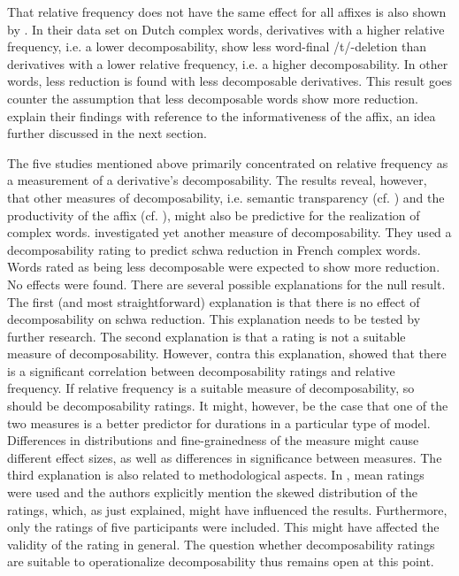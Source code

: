 {That relative frequency does not have the same effect for all affixes is also shown by \cite{Schuppler.2012}. In their data set on Dutch complex words, derivatives with a higher relative frequency, i.e. a lower decomposability, show less word-final /t/-deletion than derivatives with a lower relative frequency, i.e. a higher decomposability. In other words, less reduction is found with less decomposable derivatives. This result goes counter the assumption that less decomposable words show more reduction. \cite{Schuppler.2012} explain their findings with reference to the informativeness of the affix, an idea further discussed in the next section.

The five studies mentioned above primarily concentrated on relative frequency as a measurement of a derivative's decomposability. The results reveal, however, that other measures of decomposability, i.e. semantic transparency (cf. \citealt{Hanique.2011}) and the productivity of the affix (cf. \citealt{Hay.2007}), might also be predictive for the realization of complex words.  
\cite{Burki.2011} investigated yet another measure of decomposability. They used a decomposability rating to predict schwa reduction in French complex words. Words rated as being less decomposable were expected to show more reduction. No effects were found. There are several possible explanations for the null result. 
The first (and most straightforward) explanation is that there is no effect of decomposability on schwa reduction. This explanation needs to be tested by further research. 
The second explanation is that a rating is not a suitable measure of decomposability. However, contra this explanation, \cite{Hay.2001,Hay.2003} showed that there is a significant correlation between decomposability ratings and relative frequency. If relative frequency is a suitable measure of decomposability, so should be decomposability ratings. It might, however, be the case that one of the two measures is a better predictor for durations in a particular type of model.  Differences in distributions and fine-grainedness of the measure might cause different effect sizes, as well as differences in significance between measures.   
The third explanation is also related to methodological aspects. In \cite{Burki.2011}, mean ratings were used and the authors explicitly mention the skewed distribution of the ratings, which, as just explained, might have influenced the results. Furthermore, only the ratings of five participants were included. This might have affected the validity of the rating in general. 
The question whether decomposability ratings are suitable to operationalize decomposability thus remains open at this point.


}
